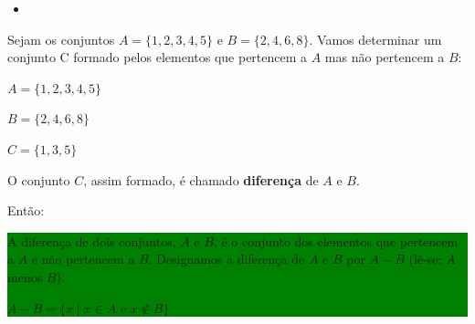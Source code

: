 \documentclass[11pt, openright, a4paper, brazil, english, french, spanish, bibjustif, openany, oneside]{abntex2}
\begin{document}
\begin{SingleSpace}
\vspace{.5cm}

\begin{itemize}

\item \textbf{}

\end{itemize}

Sejam os conjuntos $A=\{1, 2, 3, 4, 5\}$ e $B=\{2, 4, 6, 8\}$.
Vamos determinar um conjunto C formado pelos elementos que pertencem a $A$ mas não pertencem a $B$:

\begin{center}
\begin{minipage}{.3\linewidth}

\begin{flushright}

$A=\{1, 2, 3, 4, 5\}$

$B=\{2, 4, 6, 8\}$

\end{flushright}

\end{minipage}
\begin{minipage}{.2\linewidth}

\resizebox{3cm}{.4cm}{$\Rightarrow$}

\end{minipage}
\begin{minipage}{.3\linewidth}

\begin{flushleft}

$C=\{1, 3, 5\}$

\end{flushleft}

\end{minipage}

\end{center}

O conjunto $C$, assim formado, é chamado \textbf{diferença} de $A$ e $B$.

Então:

\colorbox{green}
{
\begin{minipage}{14.7cm}

A diferença de dois conjuntos, $A$ e $B$, é o conjunto dos elementos que pertencem a $A$ e não pertencem a $B$.
Designamos a diferença de $A$ e $B$ por $A - B$ (lê-se: $A$ menos $B$).

$A - B = \{ x \mid x \in A$ e $x \not\in B\}$

\end{minipage}
}


\end{SingleSpace}
\end{document}
